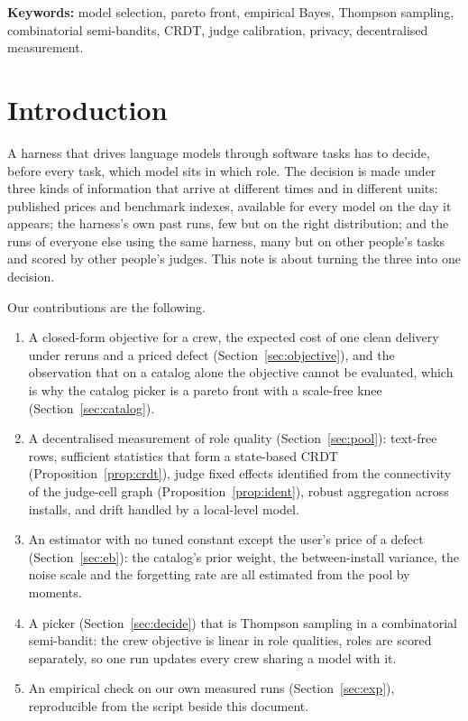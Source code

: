 \documentclass[10pt,a4paper]{article}
\theoremstyle{definition}
\theoremstyle{remark}
\begin{document}
\vspace{4pt}
\noindent\textbf{Keywords:} model selection, pareto front, empirical Bayes, Thompson sampling, combinatorial semi-bandits, CRDT, judge calibration, privacy, decentralised measurement.

\section{Introduction}

A harness that drives language models through software tasks has to decide, before every task, which model sits in which role. The decision is made under three kinds of information that arrive at different times and in different units: published prices and benchmark indexes, available for every model on the day it appears; the harness's own past runs, few but on the right distribution; and the runs of everyone else using the same harness, many but on other people's tasks and scored by other people's judges. This note is about turning the three into one decision.

Our contributions are the following.
\begin{enumerate}
\item A closed-form objective for a crew, the expected cost of one clean delivery under reruns and a priced defect (Section~\ref{sec:objective}), and the observation that on a catalog alone the objective cannot be evaluated, which is why the catalog picker is a pareto front with a scale-free knee (Section~\ref{sec:catalog}).
\item A decentralised measurement of role quality (Section~\ref{sec:pool}): text-free rows, sufficient statistics that form a state-based CRDT (Proposition~\ref{prop:crdt}), judge fixed effects identified from the connectivity of the judge-cell graph (Proposition~\ref{prop:ident}), robust aggregation across installs, and drift handled by a local-level model.
\item An estimator with no tuned constant except the user's price of a defect (Section~\ref{sec:eb}): the catalog's prior weight, the between-install variance, the noise scale and the forgetting rate are all estimated from the pool by moments.
\item A picker (Section~\ref{sec:decide}) that is Thompson sampling in a combinatorial semi-bandit: the crew objective is linear in role qualities, roles are scored separately, so one run updates every crew sharing a model with it.
\item An empirical check on our own measured runs (Section~\ref{sec:exp}), reproducible from the script beside this document.
\end{enumerate}
\end{document}

